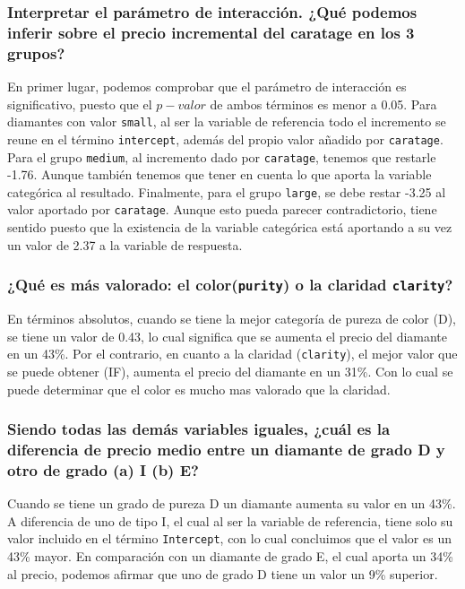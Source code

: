 \documentclass[a4paper, 7pt]{article}
\begin{document}
\subsubsection{Interpretar el parámetro de interacción. ¿Qué podemos inferir sobre el precio incremental del caratage en los 3 grupos?}

En primer lugar, podemos comprobar que el parámetro de interacción es significativo, puesto que el $p-valor$ de ambos términos es menor a 0.05.  Para diamantes con valor \texttt{small}, al ser la variable de referencia todo el incremento se reune en el término \texttt{intercept}, además del propio valor añadido por \texttt{caratage}. Para el grupo \texttt{medium}, al incremento dado por \texttt{caratage}, tenemos que restarle -1.76. Aunque también tenemos que tener en cuenta lo que aporta la variable categórica al resultado. Finalmente, para el grupo \texttt{large}, se debe restar -3.25 al valor aportado por \texttt{caratage}. Aunque esto pueda parecer contradictorio, tiene sentido puesto que la existencia de la variable categórica está aportando a su vez un valor de 2.37 a la variable de respuesta.

\subsubsection{¿Qué es más valorado: el color(\texttt{purity}) o la claridad \texttt{clarity}? }

En términos absolutos, cuando se tiene la mejor categoría de pureza de color (D), se tiene un valor de 0.43, lo cual significa que se aumenta el precio del diamante en un 43\%. Por el contrario, en cuanto a la claridad (\texttt{clarity}), el mejor valor que se puede obtener (IF), aumenta el precio del diamante en un 31\%.  Con lo cual se puede determinar que el color es mucho mas valorado que la claridad.

\subsubsection{Siendo todas las demás variables iguales, ¿cuál es la diferencia de precio medio entre un diamante de grado D y otro de grado (a) I (b) E? }

Cuando se tiene un grado de pureza D un diamante aumenta su valor en un 43\%. A diferencia de uno de tipo I, el cual al ser la variable de referencia, tiene solo su valor incluido en el término \texttt{Intercept}, con lo cual concluimos que el valor es un 43\% mayor. En comparación con un diamante de grado E, el cual aporta un 34\% al precio, podemos afirmar que uno de grado D tiene un valor un 9\% superior.
\end{document}
